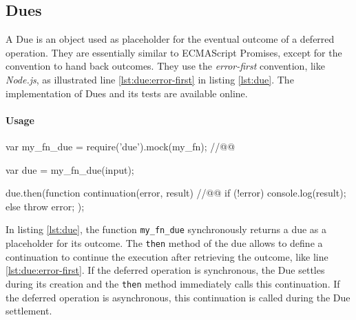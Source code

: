 
\subsection{Dues} \label{chapter5:due:definition}

A Due is an object used as placeholder for the eventual outcome of a deferred operation.
They are essentially similar to ECMAScript Promises, except for the convention to hand back outcomes.
They use the \textit{error-first} convention, like \textit{Node.js}, as illustrated line \ref{lst:due:error-first} in listing \ref{lst:due}.
The implementation of Dues and its tests are available online.

\paragraph{Usage}

\begin{code}[js, %
             caption={Example of a due}, %
             label={lst:due}] %
var my_fn_due = require('due').mock(my_fn); //@\label{lst:due:mock}@

var due = my_fn_due(input);

due.then(function continuation(error, result) { //@\label{lst:due:error-first}@
  if (!error) {
    console.log(result);
  } else {
    throw error;
  }
});
\end{code}


In listing \ref{lst:due}, the function \texttt{my\_fn\_due} synchronously returns a due as a placeholder for its outcome.
The \texttt{then} method of the due allows to define a continuation to continue the execution after retrieving the outcome, like line \ref{lst:due:error-first}.
If the deferred operation is synchronous, the Due settles during its creation and the \texttt{then} method immediately calls this continuation.
If the deferred operation is asynchronous, this continuation is called during the Due settlement.

